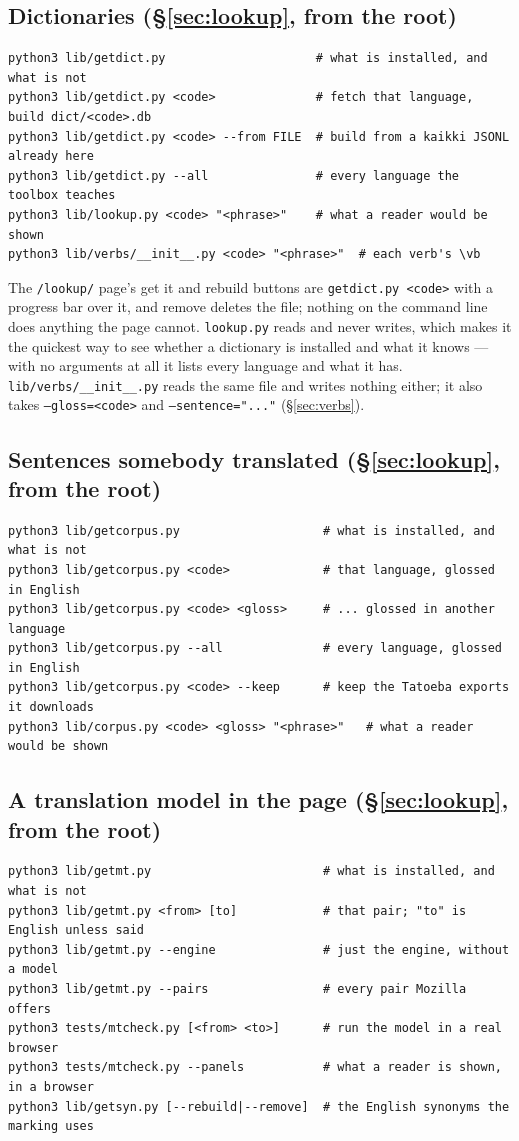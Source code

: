 \documentclass[11pt,oneside]{report}
\newcommand{\file}[1]{\texttt{#1}}
\newcommand{\menu}[1]{\textsf{#1}}
\begin{document}
\subsection*{Dictionaries (\S\ref{sec:lookup}, from the root)}
\begin{lstlisting}
python3 lib/getdict.py                     # what is installed, and what is not
python3 lib/getdict.py <code>              # fetch that language, build dict/<code>.db
python3 lib/getdict.py <code> --from FILE  # build from a kaikki JSONL already here
python3 lib/getdict.py --all               # every language the toolbox teaches
python3 lib/lookup.py <code> "<phrase>"    # what a reader would be shown
python3 lib/verbs/__init__.py <code> "<phrase>"  # each verb's \vb
\end{lstlisting}

The \texttt{/lookup/} page's \menu{get it} and \menu{rebuild} buttons are
\file{getdict.py <code>} with a progress bar over it, and \menu{remove}
deletes the file; nothing on the command line does anything the page cannot.
\file{lookup.py} reads and never writes, which makes it the quickest way to
see whether a dictionary is installed and what it knows --- with no arguments
at all it lists every language and what it has. \file{lib/verbs/\_\_init\_\_.py}
reads the same file and writes nothing either; it also takes
\texttt{--gloss=<code>} and \texttt{--sentence="..."} (\S\ref{sec:verbs}).

\subsection*{Sentences somebody translated (\S\ref{sec:lookup}, from the root)}
\begin{lstlisting}
python3 lib/getcorpus.py                    # what is installed, and what is not
python3 lib/getcorpus.py <code>             # that language, glossed in English
python3 lib/getcorpus.py <code> <gloss>     # ... glossed in another language
python3 lib/getcorpus.py --all              # every language, glossed in English
python3 lib/getcorpus.py <code> --keep      # keep the Tatoeba exports it downloads
python3 lib/corpus.py <code> <gloss> "<phrase>"   # what a reader would be shown
\end{lstlisting}

\subsection*{A translation model in the page (\S\ref{sec:lookup}, from the root)}
\begin{lstlisting}
python3 lib/getmt.py                        # what is installed, and what is not
python3 lib/getmt.py <from> [to]            # that pair; "to" is English unless said
python3 lib/getmt.py --engine               # just the engine, without a model
python3 lib/getmt.py --pairs                # every pair Mozilla offers
python3 tests/mtcheck.py [<from> <to>]      # run the model in a real browser
python3 tests/mtcheck.py --panels           # what a reader is shown, in a browser
python3 lib/getsyn.py [--rebuild|--remove]  # the English synonyms the marking uses
\end{lstlisting}
\end{document}
